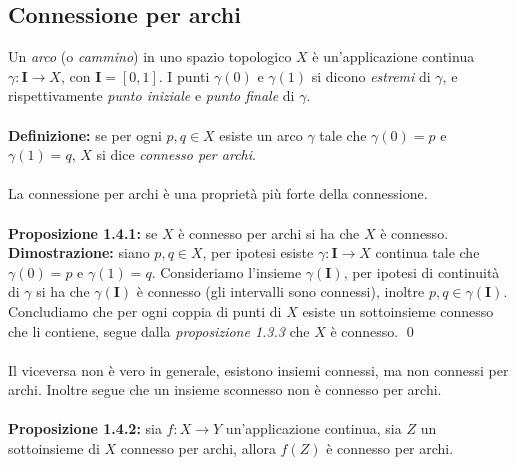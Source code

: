 \documentclass{article}
\begin{document}
\newpage
\subsection{Connessione per archi}
Un \textit{arco} (o \textit{cammino}) in uno spazio topologico $X$ è un'applicazione continua $\gamma : \mathbf{I} \longrightarrow X$, con $\mathbf{I} = [0, 1]$. I punti $\gamma(0)$ e $\gamma(1)$ si dicono \textit{estremi} di $\gamma$, e rispettivamente \textit{punto iniziale} e \textit{punto finale} di $\gamma$. \\ \\
\textbf{Definizione:} se per ogni $p, q \in X$ esiste un arco $\gamma$ tale che $\gamma(0) = p$ e $\gamma(1) = q$, $X$ si dice \textit{connesso per archi}. \\ \\
La connessione per archi è una proprietà più forte della connessione. \\ \\
\textbf{Proposizione 1.4.1:} se $X$ è connesso per archi si ha che $X$ è connesso. \\

\textbf{Dimostrazione:} siano $p, q \in X$, per ipotesi esiste $\gamma : \mathbf{I} \longrightarrow X$ continua tale che $\gamma(0) = p$ e $\gamma(1) = q$. Consideriamo l'insieme $\gamma(\mathbf{I})$, per ipotesi di continuità di $\gamma$ si ha che $\gamma(\mathbf{I})$ è connesso (gli intervalli sono connessi), inoltre $p, q \in \gamma(\mathbf{I})$. Concludiamo che per ogni coppia di punti di $X$ esiste un sottoinsieme connesso che li contiene, segue dalla \textit{proposizione 1.3.3} che $X$ è connesso. \qed \\ \\
Il viceversa non è vero in generale, esistono insiemi connessi, ma non connessi per archi. Inoltre segue che un insieme sconnesso non è connesso per archi. \\ \\
\textbf{Proposizione 1.4.2:} sia $f : X \longrightarrow Y$ un'applicazione continua, sia $Z$ un sottoinsieme di $X$ connesso per archi, allora $f(Z)$ è connesso per archi. \\ 
\end{document}
